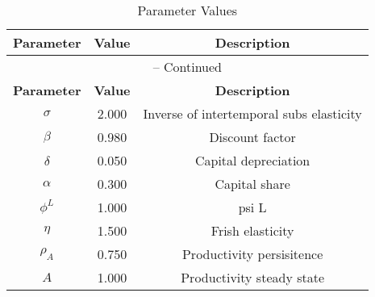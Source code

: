 \begin{center}
\begin{longtable}{ccc}
\caption{Parameter Values}\\%
\toprule%
\multicolumn{1}{c}{\textbf{Parameter}} &
\multicolumn{1}{c}{\textbf{Value}} &
 \multicolumn{1}{c}{\textbf{Description}}\\%
\midrule%
\endfirsthead
\multicolumn{3}{c}{{\tablename} \thetable{} -- Continued}\\%
\midrule%
\multicolumn{1}{c}{\textbf{Parameter}} &
\multicolumn{1}{c}{\textbf{Value}} &
  \multicolumn{1}{c}{\textbf{Description}}\\%
\midrule%
\endhead
$\sigma$ 	 & 	 2.000 	 & 	 Inverse of intertemporal subs elasticity\\
$\beta$ 	 & 	 0.980 	 & 	 Discount factor\\
$\delta$ 	 & 	 0.050 	 & 	 Capital depreciation\\
$\alpha$ 	 & 	 0.300 	 & 	 Capital share\\
$\phi^{L}$ 	 & 	 1.000 	 & 	 psi L\\
$\eta$ 	 & 	 1.500 	 & 	 Frish elasticity\\
$\rho_{A}$ 	 & 	 0.750 	 & 	 Productivity persisitence\\
$A$ 	 & 	 1.000 	 & 	 Productivity steady state\\
\bottomrule%
\end{longtable}
\end{center}
